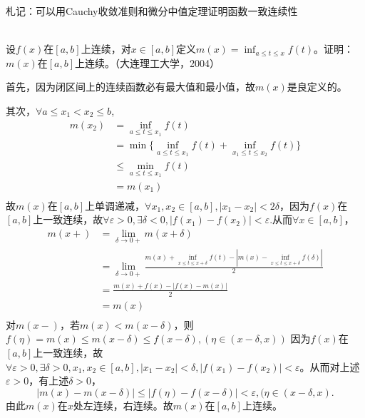 \begin{remark}
  札记：可以用Cauchy收敛准则和微分中值定理证明函数一致连续性
\end{remark}

\begin{example}
\hfill\\
  设$f(x)$在$[a,b]$上连续，对$x\in[a,b]$定义$\displaystyle m(x)=\inf_{a\leq t\leq x}f(t)$。证明：$m(x)$在$[a,b]$上连续。（大连理工大学，2004）
  
  
  首先，因为闭区间上的连续函数必有最大值和最小值，故$m(x)$是良定义的。
  
  其次，$\forall a\leq x_1<x_2\leq b$,
  \[
  \begin{aligned}
  m(x_2)&=\inf_{a\leq t\leq x_1}f(t)\\
  &=\min\{\inf_{a\leq t\leq x_1}f(t)+\inf_{x_1\leq t\leq x_2}f(t)\}\\
  &\leq\min_{a\leq t\leq x_1}f(t)\\
  &=m(x_1)\\
  \end{aligned}
  \]
  故$m(x)$在$[a,b]$上单调递减，$\forall x_1,x_2\in[a,b],|x_1-x_2|<2\delta$，因为$f(x)$在$[a,b]$上一致连续，故$\forall\varepsilon>0,\exists\delta<0,|f(x_1)-f(x_2)|<\varepsilon.$从而$\forall x\in[a,b]$，
  \[
  \begin{aligned}
  m(x+)&=\lim_{\delta\rightarrow0+}m(x+\delta)\\
  &=\lim_{\delta\rightarrow0+}\frac{m(x)+\inf_{x\leq t\leq x+\delta}f(t)-|m(x)-\inf_{x\leq t\leq x+\delta}f(\delta)|}{2}\\
  &=\frac{m(x)+f(x)-|f(x)-m(x)|}{2}\\
  &=m(x)\\
  \end{aligned}
  \]
  对$m(x-)$，若$m(x)<m(x-\delta)$，则$f(\eta)=m(x)\leq m(x-\delta)\leq f(x-\delta),(\eta\in(x-\delta,x))$
  因为$f(x)$在$[a,b]$上一致连续，故$\forall\varepsilon>0,\exists\delta>0,x_1,x_2\in[a,b],|x_1-x_2|<\delta,|f(x_1)-f(x_2)|<\varepsilon$。从而对上述$\varepsilon>0$，有上述$\delta>0$，$$|m(x)-m(x-\delta)|\leq|f(\eta)-f(x-\delta)|<\varepsilon,(\eta\in(x-\delta,x).$$
  由此$m(x)$在$x$处左连续，右连续。故$m(x)$在$[a,b]$上连续。
  \end{example}
  
